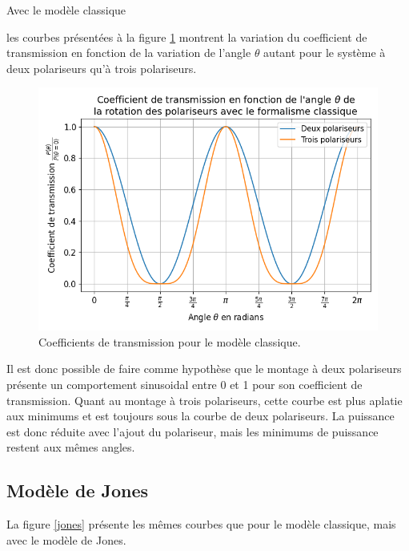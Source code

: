 \documentclass[11pt,letterpaper]{article}
\begin{document}
Avec le modèle classique

les courbes présentées à la figure \ref{classique} montrent la variation
du coefficient de transmission en fonction de la variation de l'angle $\theta$ autant pour le 
système à deux polariseurs qu'à trois polariseurs.

\begin{figure}[H]
  \centering
  \includegraphics[scale=0.7]{coeff_classique.png}
  \caption{Coefficients de transmission pour le modèle classique.}
  \label{classique}
\end{figure}

Il est donc possible de faire comme hypothèse que le montage à deux polariseurs présente un comportement
sinusoidal entre 0 et 1 pour son coefficient de transmission. Quant au montage à trois polariseurs, cette
courbe est plus aplatie aux minimums et est toujours sous la courbe de deux polariseurs. La puissance est
donc réduite avec l'ajout du polariseur, mais les minimums de puissance restent aux mêmes angles.

\subsection{Modèle de Jones}

La figure \ref{jones} présente les mêmes courbes que pour le modèle classique, mais avec le modèle de Jones.
\end{document}
